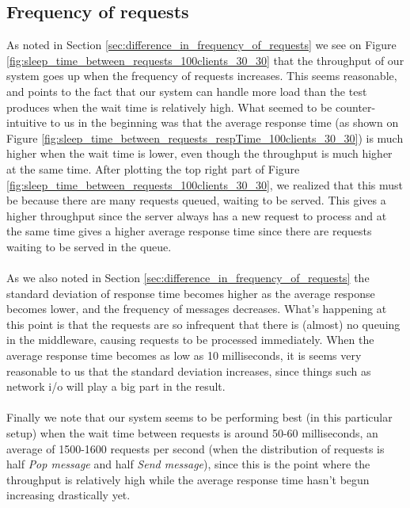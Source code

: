 \documentclass{article}
\begin{document}
\begin{table}
\begin{tabular}
        \subsection{Frequency of requests}
            \label{sec:frequency_of_requests}
            As noted in Section \ref{sec:difference_in_frequency_of_requests} we see on Figure \ref{fig:sleep_time_between_requests_100clients_30_30} that the throughput of our system goes up when the frequency of requests increases. This seems reasonable, and points to the fact that our system can handle more load than the test produces when the wait time is relatively high. What seemed to be counter-intuitive to us in the beginning was that the average response time (as shown on Figure \ref{fig:sleep_time_between_requests_respTime_100clients_30_30}) is much higher when the wait time is lower, even though the throughput is much higher at the same time. After plotting the top right part of Figure \ref{fig:sleep_time_between_requests_100clients_30_30}, we realized that this must be because there are many requests queued, waiting to be served. This gives a higher throughput since the server always has a new request to process and at the same time gives a higher average response time since there are requests waiting to be served in the queue.\\
            \\
            As we also noted in Section \ref{sec:difference_in_frequency_of_requests} the standard deviation of response time becomes higher as the average response becomes lower, and the frequency of messages decreases. What's happening at this point is that the requests are so infrequent that there is (almost) no queuing in the middleware, causing requests to be processed immediately. When the average response time becomes as low as 10 milliseconds, it is seems very reasonable to us that the standard deviation increases, since things such as network i/o will play a big part in the result.\\
            \\
            Finally we note that our system seems to be performing best (in this particular setup) when the wait time between requests is around 50-60 milliseconds, an average of 1500-1600 requests per second (when the distribution of requests is half \textit{Pop message} and half \textit{Send message}), since this is the point where the throughput is relatively high while the average response time hasn't begun increasing drastically yet.


\end{tabular}
\end{table}
\end{document}
